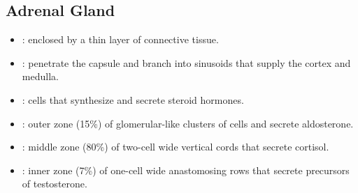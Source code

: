 \subsection{Adrenal Gland}
\begin{center}
\end{center}
\begin{multicols}{2}
\begin{itemize}
  \item {}: enclosed by a thin layer of connective tissue.
  
  \begin{center}
  \end{center}
  
  \item {}:  penetrate the capsule and branch into sinusoids that supply the cortex and medulla.
  
  \begin{center}
  \end{center}
  
  \vspace{20pt}

  \item {}:  cells that synthesize and secrete steroid hormones. 
  
  \begin{center}
  \end{center}
  
  \item {}:  outer zone (15\%) of glomerular-like clusters of cells and secrete aldosterone.
  
  \begin{center}
  \end{center}
  
  \item {}: middle zone (80\%) of two-cell wide vertical cords that secrete cortisol. 
  
  \begin{center}
  \end{center}
  
  \item {}: inner zone (7\%) of one-cell wide anastomosing rows that secrete precursors of testosterone. 
  

\end{itemize}
\end{multicols}
